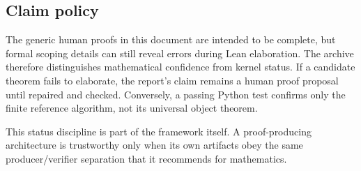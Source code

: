 \subsection{Claim policy}

The generic human proofs in this document are intended to be complete, but
formal scoping details can still reveal errors during Lean elaboration.  The
archive therefore distinguishes mathematical confidence from kernel status.
If a candidate theorem fails to elaborate, the report's claim remains a human
proof proposal until repaired and checked.  Conversely, a passing Python test
confirms only the finite reference algorithm, not its universal object theorem.

This status discipline is part of the framework itself.  A proof-producing
architecture is trustworthy only when its own artifacts obey the same
producer/verifier separation that it recommends for mathematics.
